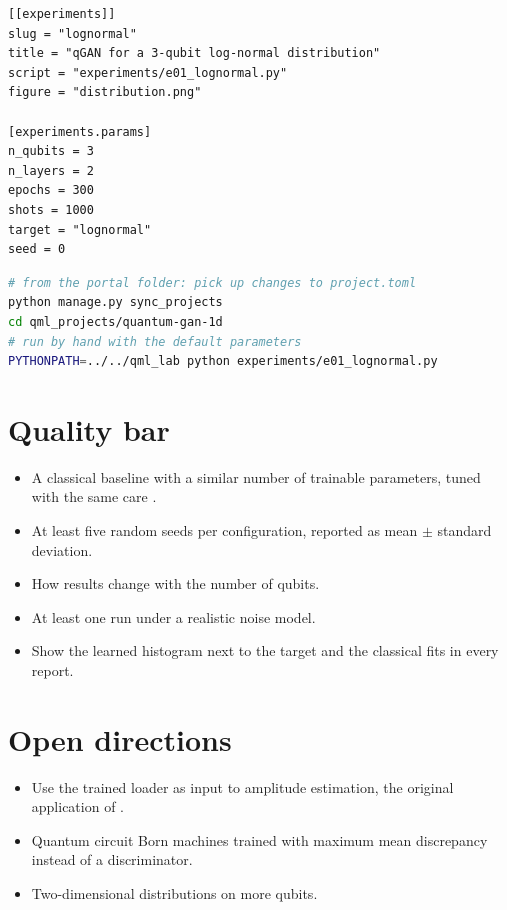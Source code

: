 \documentclass[11pt,a4paper]{article}
\begin{document}
\begin{lstlisting}[language={}]
[[experiments]]
slug = "lognormal"
title = "qGAN for a 3-qubit log-normal distribution"
script = "experiments/e01_lognormal.py"
figure = "distribution.png"

[experiments.params]
n_qubits = 3
n_layers = 2
epochs = 300
shots = 1000
target = "lognormal"
seed = 0
\end{lstlisting}

\begin{lstlisting}[language=bash]
# from the portal folder: pick up changes to project.toml
python manage.py sync_projects
cd qml_projects/quantum-gan-1d
# run by hand with the default parameters
PYTHONPATH=../../qml_lab python experiments/e01_lognormal.py
\end{lstlisting}

\section{Quality bar}
\begin{itemize}
  \item A classical baseline with a similar number of trainable parameters, tuned with the same care \citep{bowles2024}.
  \item At least five random seeds per configuration, reported as mean $\pm$ standard deviation.
  \item How results change with the number of qubits.
  \item At least one run under a realistic noise model.
  \item Show the learned histogram next to the target and the classical fits in every report.
\end{itemize}

\section{Open directions}
\begin{itemize}
  \item Use the trained loader as input to amplitude estimation, the original application of \citet{zoufal2019}.
  \item Quantum circuit Born machines trained with maximum mean discrepancy instead of a discriminator.
  \item Two-dimensional distributions on more qubits.
\end{itemize}
\end{document}
